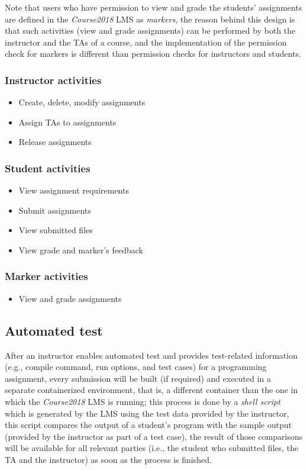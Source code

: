 \medskip 

Note that users who have permission to view and grade the students' assignments
are defined in the \emph{Course2018} LMS as \emph{markers}, the reason behind
this design is that such activities (view and grade assignments) can be
performed by both the instructor and the TAs of a course, and the implementation
of the permission check for markers is different than permission checks for
instructors and students.

\medskip

\subsubsection{Instructor activities}
\begin{itemize}
    \item Create, delete, modify assignments
    \item Assign TAs to assignments
    \item Release assignments
\end{itemize}

\subsubsection{Student activities}
\begin{itemize}
    \item View assignment requirements
    \item Submit assignments
    \item View submitted files
    \item View grade and marker's feedback
\end{itemize}

\subsubsection{Marker activities}
\begin{itemize}
    \item View and grade assignments
\end{itemize}

\subsection{Automated test}
After an instructor enables automated test and provides test-related
information (e.g., compile command, run options, and test cases) for a
programming assignment,
every submission will be built (if required) and executed in a separate
containerized environment, that is, a different
container than the one in which the \emph{Course2018} LMS is running; 
this process is done by a \emph{shell script} which is generated by the LMS
using the test data provided by the instructor, this script compares the
output of a student's program with the sample output (provided by the instructor
as part of a test case), the result of those comparisons will be available for
all relevant parties (i.e., the student who submitted files, the TA and
the instructor) as soon as the process is finished.

